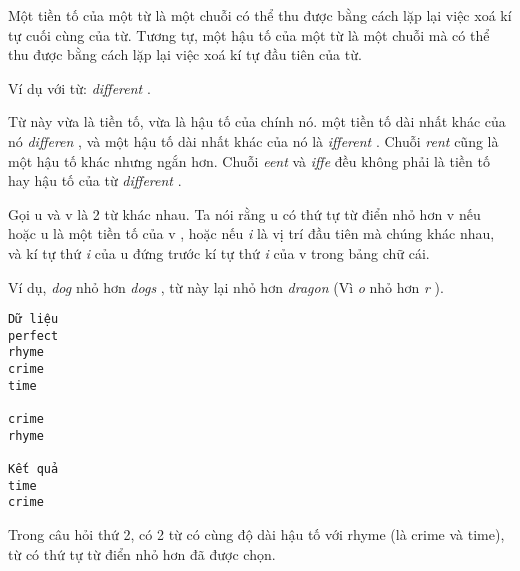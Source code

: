 Một tiền tố của một từ là một chuỗi có thể thu được bằng cách lặp lại việc xoá kí tự cuối cùng của từ. Tương tự, một hậu tố của một từ là một chuỗi mà có thể thu được bằng cách lặp lại việc xoá kí tự đầu tiên của từ.  

   Ví dụ với từ:   \textit{    different   }   .  

   Từ này vừa là tiền tố, vừa là hậu tố của chính nó. một tiền tố dài nhất khác của nó   \textit{    differen   }   , và một hậu tố dài nhất khác của nó là   \textit{    ifferent   }   . Chuỗi   \textit{    rent   }   cũng là một hậu tố khác nhưng ngắn hơn. Chuỗi   \textit{    eent   }   và   \textit{    iffe   }   đều không phải là tiền tố hay hậu tố của từ   \textit{    different   }   .  

   Gọi       u      và       v      là 2 từ khác nhau. Ta nói rằng       u      có thứ tự từ điển nhỏ hơn       v      nếu hoặc       u      là một tiền tố của       v      , hoặc nếu   \textit{    i   }   là vị trí đầu tiên mà chúng khác nhau, và kí tự thứ   \textit{    i   }   của       u      đứng trước kí tự thứ   \textit{    i   }   của       v      trong bảng chữ cái.  

   Ví dụ,   \textit{    dog   }   nhỏ hơn   \textit{    dogs   }   , từ này lại nhỏ hơn   \textit{    dragon   }   (Vì   \textit{    o   }   nhỏ hơn   \textit{    r   }   ).
\begin{verbatim}
Dữ liệu
perfect
rhyme
crime
time

crime
rhyme

Kết quả
time
crime
\end{verbatim}

   Trong câu hỏi thứ 2, có 2 từ có cùng độ dài hậu tố với rhyme (là crime và time), từ có thứ tự từ điển nhỏ hơn đã được chọn.